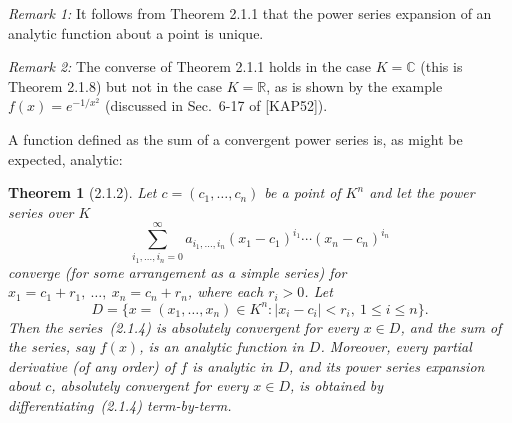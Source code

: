 \documentclass[11pt]{article}
\theoremstyle{plain}
\newtheorem*{theorem*}{Theorem}
\theoremstyle{definition}
\newcommand{\R}{\mathbb{R}}
\newcommand{\C}{\mathbb{C}}
\begin{document}
\textit{Remark 1:} It follows from Theorem 2.1.1 that the power series
expansion of an analytic function about a point is unique.

\textit{Remark 2:} The converse of Theorem 2.1.1 holds in the case
$K = \C$ (this is Theorem 2.1.8) but not in the case $K = \R$, as is
shown by the example $f(x) = e^{-1/x^2}$ (discussed in Sec.~6-17 of
[KAP52]).

A function defined as the sum of a convergent power series is, as might
be expected, analytic:

\begin{theorem*}[2.1.2]
Let $c = (c_1, \ldots, c_n)$ be a point of $K^n$ and let the power
series over $K$
\begin{equation}
\sum_{i_1, \ldots, i_n = 0}^{\infty}
a_{i_1, \ldots, i_n} (x_1 - c_1)^{i_1} \cdots (x_n - c_n)^{i_n}
\tag{2.1.4}
\end{equation}
converge (for some arrangement as a simple series) for
$x_1 = c_1 + r_1,\ \ldots,\ x_n = c_n + r_n$, where each $r_i > 0$. Let
\[
D = \{ x = (x_1, \ldots, x_n) \in K^n : |x_i - c_i| < r_i,\
1 \le i \le n \}.
\]
Then the series~(2.1.4) is absolutely convergent for every $x \in D$, and
the sum of the series, say $f(x)$, is an analytic function in $D$.
Moreover, every partial derivative (of any order) of $f$ is analytic in
$D$, and its power series expansion about $c$, absolutely convergent for
every $x \in D$, is obtained by differentiating~(2.1.4) term-by-term.
\end{theorem*}
\end{document}
